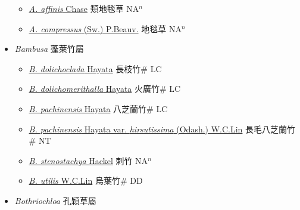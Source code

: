 \begin{itemize}
  \begin{itemize}
        \item[] \href{http://www.theplantlist.org/tpl1.1/search?q=Axonopus+affinis}{\textit{A. affinis} Chase}   類地毯草 NA$^n$
        \item[] \href{http://www.theplantlist.org/tpl1.1/search?q=Axonopus+compressus}{\textit{A. compressus} (Sw.) P.Beauv.}   地毯草 NA$^n$
  \end{itemize}
 \item[] \textit{Bambusa} 蓬萊竹屬
                    
  \begin{itemize}
        \item[] \href{http://www.theplantlist.org/tpl1.1/search?q=Bambusa+dolichoclada}{\textit{B. dolichoclada} Hayata}   長枝竹\# LC
        \item[] \href{http://www.theplantlist.org/tpl1.1/search?q=Bambusa+dolichomerithalla}{\textit{B. dolichomerithalla} Hayata}   火廣竹\# LC
        \item[] \href{http://www.theplantlist.org/tpl1.1/search?q=Bambusa+pachinensis}{\textit{B. pachinensis} Hayata}   八芝蘭竹\# LC
        \item[] \href{http://www.theplantlist.org/tpl1.1/search?q=Bambusa+pachinensis+var.+hirsutissima}{\textit{B. pachinensis} Hayata var. \textit{hirsutissima} (Odash.) W.C.Lin}   長毛八芝蘭竹\# NT
        \item[] \href{http://www.theplantlist.org/tpl1.1/search?q=Bambusa+stenostachya}{\textit{B. stenostachya} Hackel}   刺竹 NA$^n$
        \item[] \href{http://www.theplantlist.org/tpl1.1/search?q=Bambusa+utilis}{\textit{B. utilis} W.C.Lin}   烏葉竹\# DD
  \end{itemize}
 \item[] \textit{Bothriochloa} 孔穎草屬
                    

\end{itemize}
